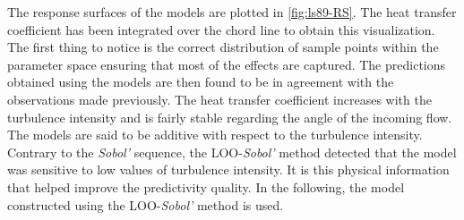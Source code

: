 The response surfaces of the models are plotted in \cref{fig:ls89-RS}. The heat transfer coefficient has been integrated over the chord line to obtain this visualization. The first thing to notice is the correct distribution of sample points within the parameter space ensuring that most of the effects are captured. The predictions obtained using the models are then found to be in agreement with the observations made previously. The heat transfer coefficient increases with the turbulence intensity and is fairly stable regarding the angle of the incoming flow. The models are said to be additive with respect to the turbulence intensity. Contrary to the \textit{Sobol'} sequence, the LOO-\textit{Sobol'} method detected that the model was sensitive to low values of turbulence intensity. It is this physical information that helped improve the predictivity quality. In the following, the model constructed using the LOO-\textit{Sobol'} method is used.

